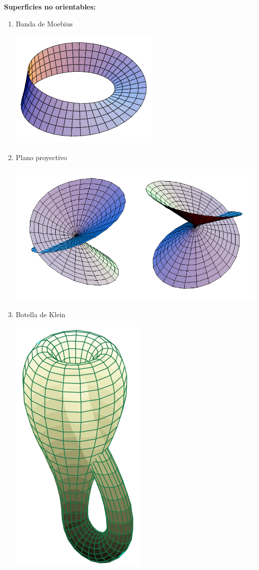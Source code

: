 \textbf{Superficies no orientables:}
\begin{multicols}{3}  %
    \begin{enumerate}
        \item Banda de Moebius
              \begin{center}
                  \includegraphics[width=0.7\linewidth]{images/moebius.png}
              \end{center}

        \item Plano proyectivo
              \begin{center}
                  \includegraphics[width=1\linewidth]{images/SelfIntersectingDisk.png}
              \end{center}
        \item Botella de Klein
              \begin{center}
                  \includegraphics[width=0.3\linewidth]{images/Klein.png}
              \end{center}
    \end{enumerate}
\end{multicols}


